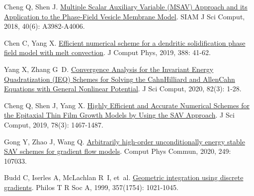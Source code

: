 \begin{thebibliography}{79}
    Cheng Q, Shen J.
    \newblock \href{https://epubs.siam.org/doi/10.1137/18M1166961}{Multiple {{Scalar Auxiliary Variable}} ({{MSAV}}) {{Approach}} and its {{Application}} to the {{Phase-Field Vesicle Membrane Model}}}\allowbreak[J].
    \newblock SIAM J Sci Comput, 2018, 40\allowbreak (6): A3982-A4006.
    
    Chen C, Yang X.
    \newblock \href{https://www.sciencedirect.com/science/article/pii/S0021999119302001}{Efficient numerical scheme for a dendritic solidification phase field model with melt convection}\allowbreak[J].
    \newblock J Comput Phys, 2019, 388: 41-62.
    
    Yang X, Zhang G~D.
    \newblock \href{https://doi.org/10.1007/s10915-020-01151-x}{Convergence {{Analysis}} for the {{Invariant Energy Quadratization}} ({{IEQ}}) {{Schemes}} for {{Solving}} the {{Cahn}}{\textendash}{{Hilliard}} and {{Allen}}{\textendash}{{Cahn Equations}} with {{General Nonlinear Potential}}}\allowbreak[J].
    \newblock J Sci Comput, 2020, 82\allowbreak (3): 1-28.
    
    Cheng Q, Shen J, Yang X.
    \newblock \href{https://doi.org/10.1007/s10915-018-0832-5}{Highly {{Efficient}} and {{Accurate Numerical Schemes}} for the {{Epitaxial Thin Film Growth Models}} by {{Using}} the {{SAV Approach}}}\allowbreak[J].
    \newblock J Sci Comput, 2019, 78\allowbreak (3): 1467-1487.
    
    Gong Y, Zhao J, Wang Q.
    \newblock \href{https://www.sciencedirect.com/science/article/pii/S0010465519303716}{Arbitrarily high-order unconditionally energy stable {{SAV}} schemes for gradient flow models}\allowbreak[J].
    \newblock Comput Phys Commun, 2020, 249: 107033.
    
    Budd C, Iserles A, McLachlan R~I, et~al.
    \newblock \href{https://royalsocietypublishing.org/doi/10.1098/rsta.1999.0363}{Geometric integration using discrete gradients}\allowbreak[J].
    \newblock Philos T R Soc A, 1999, 357\allowbreak (1754): 1021-1045.


\end{thebibliography}

